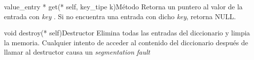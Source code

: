 \begin{apientry}{value\_entry * get(* self, key\_tipe k)}{Método}
    Retorna un puntero al valor de la entrada con \emph{key} . Si no encuentra una entrada con dicho \emph{key}, retorna NULL.
\end{apientry}

\begin{apientry}{void destroy(* self)}{Destructor}
    Elimina todas las entradas del diccionario y limpia la memoria. Cualquier intento de acceder al contenido del diccionario después de llamar al destructor causa un \emph{segmentation fault}
\end{apientry}






